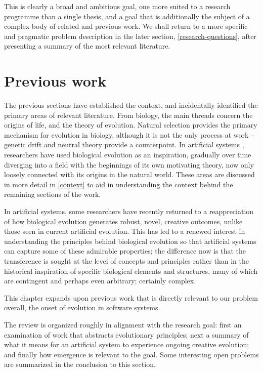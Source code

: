 \documentclass[]{report}
\begin{document}
This is clearly a broad and ambitious goal, one more suited to a research programme than a single thesis, and a goal that is additionally the subject of a complex body of related and previous work. We shall return to a more specific and pragmatic problem description in the later section, \ref{research-questions}, after presenting a summary of the most relevant literature.

\section{Previous work}
The previous sections have established the context, and incidentally identified the primary areas of relevant literature. From biology, the main threads concern the origins of life, and the theory of evolution. Natural selection provides the primary mechanism for evolution in biology, although it is not the only process at work -- genetic drift \cite{XXX} and neutral theory \cite{Kimura} provide a counterpoint. In artificial systems , researchers have used biological evolution as an inspiration, gradually over time diverging into a field with the beginnings of its own motivating theory, now only loosely connected with its origins in the natural world. These areas are discussed in more detail in \ref{context} to aid in understanding the context behind the remaining sections of the work.

In artificial systems, some researchers have recently returned to a reappreciation of how biological evolution generates robust, novel, creative outcomes, unlike those seen in current artificial evolution. This has led to a renewed interest in understanding the principles behind biological evolution so that artificial systems can capture some of these admirable properties; the difference now is that the transference is sought at the level of concepts and principles rather than in the historical inspiration of specific biological elements and structures, many of which are contingent and perhaps even arbitrary; certainly complex.

This chapter expands upon previous work that is directly relevant to our problem overall, the onset of evolution in software systems. 

The review is organized roughly in alignment with the research goal: first an examination of work that abstracts evolutionary principles; next a summary of what it means for an artificial system to experience ongoing creative evolution; and finally how emergence is relevant to the goal. Some interesting open problems are summarized in the conclusion to this section.
\end{document}
